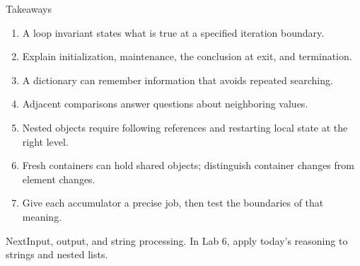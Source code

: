 \documentclass[aspectratio=169,10pt]{beamer}
\begin{document}
\begin{frame}{Takeaways}
\small
\begin{enumerate}
 \item A loop invariant states what is true at a specified iteration boundary.
 \item Explain initialization, maintenance, the conclusion at exit, and termination.
 \item A dictionary can remember information that avoids repeated searching.
 \item Adjacent comparisons answer questions about neighboring values.
 \item Nested objects require following references and restarting local state at the right level.
 \item Fresh containers can hold shared objects; distinguish container changes from element changes.
 \item Give each accumulator a precise job, then test the boundaries of that meaning.
\end{enumerate}
\begin{block}{Next}Input, output, and string processing. In Lab 6, apply today's reasoning to strings and nested lists.\end{block}
\end{frame}
\end{document}
